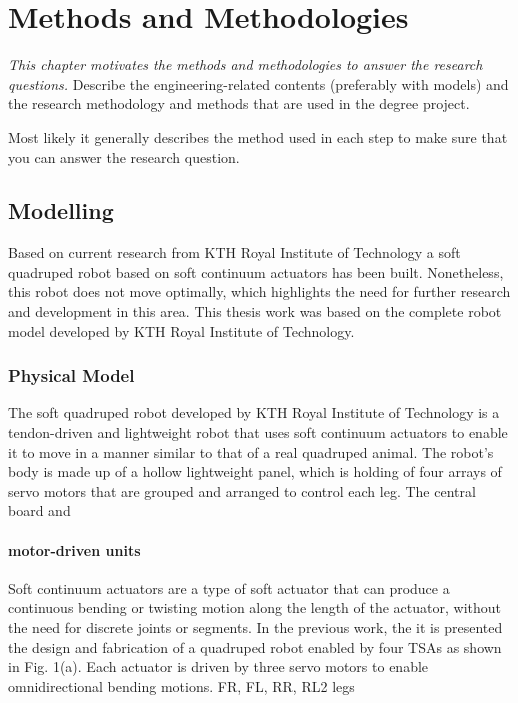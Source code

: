 \chapter{Methods and Methodologies}
\label{chap3}
\textit{This chapter motivates the methods and methodologies to answer the research questions.}
Describe the engineering-related contents (preferably with models) and the research methodology and methods that are used in the degree project. 

Most likely it generally describes the method used in each step to make sure that you can answer the research question.
\section{Modelling}
Based on current research from KTH Royal Institute of Technology\cite{jiSynthesizingOptimalGait2022,daneliaStructureGaitOptimizationof2021,thorapallimuralidharanContinuumActuatorBased2020,jiLearningbasedControl4D} a soft quadruped robot based on soft continuum actuators has been built. Nonetheless, this robot does not move optimally, which highlights the need for further research and development in this area. This thesis work was based on the complete robot model developed by KTH Royal Institute of Technology.
\subsection{Physical Model}
The soft quadruped robot developed by KTH Royal Institute of Technology is a tendon-driven and lightweight robot that uses soft continuum actuators to enable it to move in a manner similar to that of a real quadruped animal. The robot's body is made up of a hollow lightweight panel, which is holding of four arrays of servo motors that are grouped and arranged to control each leg. The central board and 
\subsubsection{motor-driven units}
Soft continuum actuators are a type of soft actuator that can produce a continuous bending or twisting motion along the length of the actuator, without the need for discrete joints or segments. In the previous work\cite{muralidharanSoftQuadrupedRobot2021}, the it is presented the design and fabrication of a quadruped robot enabled by four TSAs as shown in Fig. 1(a). Each actuator is driven by three servo motors to enable omnidirectional bending motions.
\ac{FR}, \ac{FL}, \ac{RR}, \ac{RL2} legs

